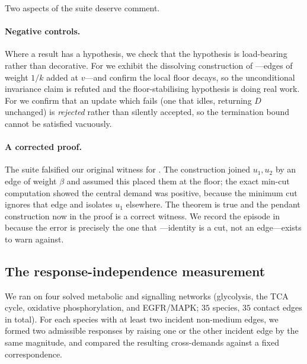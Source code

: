 \documentclass[11pt,twocolumn,a4paper]{article}
\theoremstyle{definition}
\theoremstyle{remark}
\newcommand{\flo}{\beta}
\begin{document}
Two aspects of the suite deserve comment.

\paragraph{Negative controls.} Where a result has a hypothesis, we check
that the hypothesis is load-bearing rather than decorative. For
 we exhibit the dissolving construction of
---edges of weight $1/k$ added at $v$---and confirm
the local floor decays, so the unconditional invariance claim is refuted
and the floor-stabilising hypothesis is doing real work. For
 we confirm that an update which fails
 (one that idles, returning $D$ unchanged) is
\emph{rejected} rather than silently accepted, so the termination bound
cannot be satisfied vacuously.

\paragraph{A corrected proof.} The suite falsified our original witness
for . The construction joined $u_1,u_2$ by an edge
of weight $\flo$ and assumed this placed them at the floor; the exact
min-cut computation showed the central demand was positive, because the
minimum cut ignores that edge and isolates $u_1$ elsewhere. The theorem
is true and the pendant construction now in the proof is a correct
witness. We record the episode in  because the error
is precisely the one that ---identity is a cut, not an
edge---exists to warn against.

\subsection{The response-independence measurement}
\label{sec:validation:respind}

We ran  on four solved metabolic and signalling networks
(glycolysis, the TCA cycle, oxidative phosphorylation, and EGFR/MAPK;
$35$ species, $35$ contact edges in total). For each species with at
least two incident non-medium edges, we formed two admissible responses
by raising one or the other incident edge by the same magnitude, and
compared the resulting cross-demands against a fixed correspondence.
\end{document}
